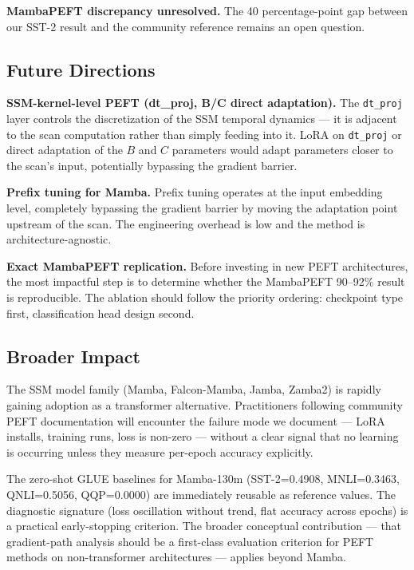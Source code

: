 \textbf{MambaPEFT discrepancy unresolved.} The 40 percentage-point gap between our SST-2 result and the community reference remains an open question.

\subsection{Future Directions}

\textbf{SSM-kernel-level PEFT (dt\_proj, B/C direct adaptation).} The \texttt{dt\_proj} layer controls the discretization of the SSM temporal dynamics --- it is adjacent to the scan computation rather than simply feeding into it. LoRA on \texttt{dt\_proj} or direct adaptation of the $B$ and $C$ parameters would adapt parameters closer to the scan's input, potentially bypassing the gradient barrier.

\textbf{Prefix tuning for Mamba.} Prefix tuning operates at the input embedding level, completely bypassing the gradient barrier by moving the adaptation point upstream of the scan. The engineering overhead is low and the method is architecture-agnostic.

\textbf{Exact MambaPEFT replication.} Before investing in new PEFT architectures, the most impactful step is to determine whether the MambaPEFT 90--92\% result is reproducible. The ablation should follow the priority ordering: checkpoint type first, classification head design second.

\subsection{Broader Impact}

The SSM model family (Mamba, Falcon-Mamba, Jamba, Zamba2) is rapidly gaining adoption as a transformer alternative. Practitioners following community PEFT documentation will encounter the failure mode we document --- LoRA installs, training runs, loss is non-zero --- without a clear signal that no learning is occurring unless they measure per-epoch accuracy explicitly.

The zero-shot GLUE baselines for Mamba-130m (SST-2=0.4908, MNLI=0.3463, QNLI=0.5056, QQP=0.0000) are immediately reusable as reference values. The diagnostic signature (loss oscillation without trend, flat accuracy across epochs) is a practical early-stopping criterion. The broader conceptual contribution --- that gradient-path analysis should be a first-class evaluation criterion for PEFT methods on non-transformer architectures --- applies beyond Mamba.
